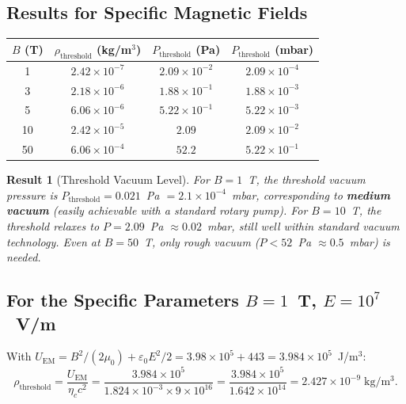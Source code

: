 \documentclass[11pt,a4paper]{article}
\newtheorem{result}{Result}
\begin{document}
\subsection{Results for Specific Magnetic Fields}

\begin{center}
\begin{tabular}{cccc}
\toprule
$B$ (T) & $\rho_{\mathrm{threshold}}$ (kg/m$^3$) & $P_{\mathrm{threshold}}$ (Pa) & $P_{\mathrm{threshold}}$ (mbar) \\
\midrule
1 & $2.42 \times 10^{-7}$ & $2.09 \times 10^{-2}$ & $2.09 \times 10^{-4}$ \\
3 & $2.18 \times 10^{-6}$ & $1.88 \times 10^{-1}$ & $1.88 \times 10^{-3}$ \\
5 & $6.06 \times 10^{-6}$ & $5.22 \times 10^{-1}$ & $5.22 \times 10^{-3}$ \\
10 & $2.42 \times 10^{-5}$ & $2.09$ & $2.09 \times 10^{-2}$ \\
50 & $6.06 \times 10^{-4}$ & $52.2$ & $5.22 \times 10^{-1}$ \\
\bottomrule
\end{tabular}
\end{center}

\begin{result}[Threshold Vacuum Level]
For $B = 1$~T, the threshold vacuum pressure is $P_{\mathrm{threshold}} = 0.021$~Pa
$= 2.1 \times 10^{-4}$~mbar, corresponding to \textbf{medium vacuum} (easily achievable
with a standard rotary pump). For $B = 10$~T, the threshold relaxes to $P = 2.09$~Pa
$\approx 0.02$~mbar, still well within standard vacuum technology. Even at $B = 50$~T,
only rough vacuum ($P < 52$~Pa $\approx 0.5$~mbar) is needed.
\end{result}

\subsection{For the Specific Parameters $B = 1$~T, $E = 10^7$~V/m}

With $U_{\mathrm{EM}} = B^2/(2\mu_0) + \varepsilon_0 E^2/2 = 3.98 \times 10^5 + 443
= 3.984 \times 10^5$~J/m$^3$:
\begin{equation}
\rho_{\mathrm{threshold}} = \frac{U_{\mathrm{EM}}}{\eta_c c^2}
= \frac{3.984 \times 10^5}{1.824 \times 10^{-3} \times 9 \times 10^{16}}
= \frac{3.984 \times 10^5}{1.642 \times 10^{14}} = 2.427 \times 10^{-9}\;\mathrm{kg/m^3}.
\end{equation}
\end{document}
